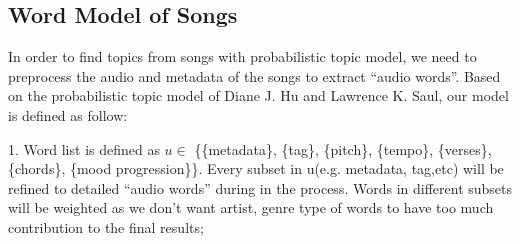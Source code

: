 \documentclass[10pt,twocolumn,letterpaper]{article}
\begin{document}
\subsection{Word Model of Songs}
In order to find topics from songs with probabilistic topic model, we need to preprocess the audio and metadata of the songs to extract “audio words”. Based on the probabilistic topic model of Diane J. Hu and Lawrence K. Saul\cite{ptm}, our model is defined as follow: 
\par
1. Word list is defined as $u \in$  \{\{metadata\}, \{tag\}, \{pitch\}, \{tempo\}, \{verses\}, \{chords\}, \{mood progression\}\}. Every subset in u(e.g. {metadata}, {tag},etc) will be refined to detailed “audio words” during in the process. Words in different subsets will be weighted as we don’t want artist, genre type of words to have too much contribution to the final results;
\par
\end{document}
